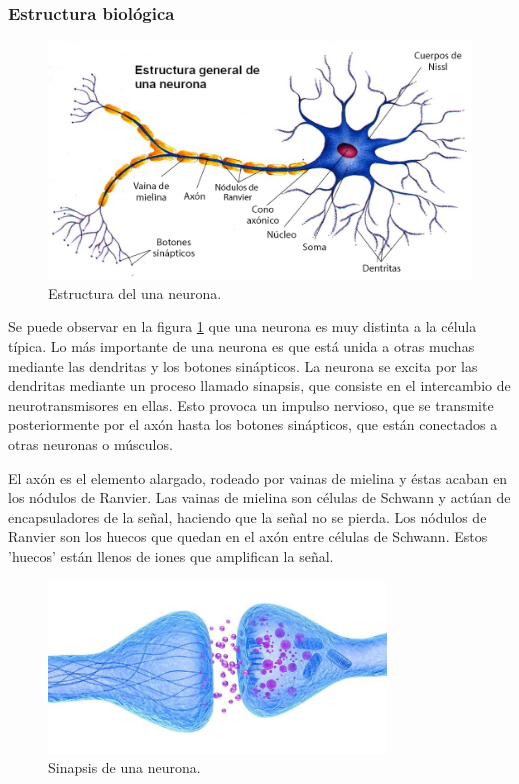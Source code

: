 \documentclass[12pt]{article}
\numberwithin{equation}{section}
\begin{document}
\subsubsection{Estructura biológica}

\begin{figure}[h]
    \centering
    \includegraphics[width=1\textwidth]{estructura_general_neurona.png}
    \caption{Estructura del una neurona.}
    \label{fig:neuronareal}
\end{figure}

Se puede observar en la figura \ref{fig:neuronareal} que una neurona es muy distinta a la célula típica. Lo más importante de una neurona es que está unida a otras muchas mediante las dendritas y los botones sinápticos. La neurona se excita por las dendritas mediante un proceso llamado sinapsis, que consiste en el intercambio de neurotransmisores en ellas. Esto provoca un impulso nervioso, que se transmite posteriormente por el axón hasta los botones sinápticos, que están conectados a otras neuronas o músculos.

El axón es el elemento alargado, rodeado por vainas de mielina y éstas acaban en los nódulos de Ranvier. Las vainas de mielina son células de Schwann y actúan de encapsuladores de la señal, haciendo que la señal no se pierda. Los nódulos de Ranvier son los huecos que quedan en el axón entre células de Schwann. Estos 'huecos' están llenos de iones que amplifican la señal.

\begin{figure}[h]
    \centering
    \includegraphics[width=0.8\textwidth]{sinapsis.jpg}
    \caption{Sinapsis de una neurona.}
    \label{fig:mesh2}
\end{figure}
\end{document}
